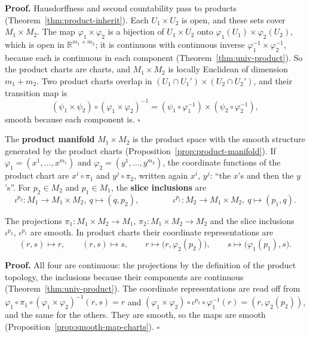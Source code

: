 \documentclass[11pt]{report}
\makeatletter
\newcounter{defcounter}[section]
\newcounter{thmcounter}[section]
\renewenvironment{proof}[1][Proof]{\noindent\textbf{#1.} }{\hfill$\square$\par\vspace{5pt}}
\newcommand{\thmlabel}[1]{\edef\@currentlabel{\arabic{section}.\arabic{thmcounter}}\label{#1}}
\newcommand{\deflabel}[1]{\edef\@currentlabel{\arabic{section}.\arabic{defcounter}}\label{#1}}
\makeatother
\begin{document}
\begin{proof}
Hausdorffness and second countability pass to products (Theorem~\ref{thm:product-inherit}). Each $U_1 \times U_2$ is open, and these sets cover $M_1 \times M_2$. The map $\varphi_1 \times \varphi_2$ is a bijection of $U_1 \times U_2$ onto $\varphi_1(U_1) \times \varphi_2(U_2)$, which is open in $\mathbb{R}^{m_1 + m_2}$; it is continuous with continuous inverse $\varphi_1^{-1} \times \varphi_2^{-1}$, because each is continuous in each component (Theorem~\ref{thm:univ-product}). So the product charts are charts, and $M_1 \times M_2$ is locally Euclidean of dimension $m_1 + m_2$. Two product charts overlap in $(U_1 \cap U_1') \times (U_2 \cap U_2')$, and their transition map is
\[
(\psi_1 \times \psi_2) \circ (\varphi_1 \times \varphi_2)^{-1} = (\psi_1 \circ \varphi_1^{-1}) \times (\psi_2 \circ \varphi_2^{-1}),
\]
smooth because each component is.
\end{proof}

\begin{defbox}\deflabel{def:product-manifold}
The \textbf{product manifold} $M_1 \times M_2$ is the product space with the smooth structure generated by the product charts (Proposition~\ref{prop:product-manifold}). If $\varphi_1 = (x^1, \ldots, x^{m_1})$ and $\varphi_2 = (y^1, \ldots, y^{m_2})$, the coordinate functions of the product chart are $x^i \circ \pi_1$ and $y^j \circ \pi_2$, written again $x^i$, $y^j$: ``the $x$'s and then the $y$'s''. For $p_2 \in M_2$ and $p_1 \in M_1$, the \textbf{slice inclusions} are
\[
\iota^{p_2} : M_1 \to M_1 \times M_2, \ q \mapsto (q, p_2), \qquad\qquad \iota^{p_1} : M_2 \to M_1 \times M_2, \ q \mapsto (p_1, q).
\]
\end{defbox}

\begin{propbox}\thmlabel{prop:product-maps}
The projections $\pi_1 : M_1 \times M_2 \to M_1$, $\pi_2 : M_1 \times M_2 \to M_2$ and the slice inclusions $\iota^{p_2}$, $\iota^{p_1}$ are smooth. In product charts their coordinate representations are
\[
(r, s) \mapsto r, \qquad (r, s) \mapsto s, \qquad r \mapsto \big(r, \varphi_2(p_2)\big), \qquad s \mapsto \big(\varphi_1(p_1), s\big).
\]
\end{propbox}

\begin{proof}
All four are continuous: the projections by the definition of the product topology, the inclusions because their components are continuous (Theorem~\ref{thm:univ-product}). The coordinate representations are read off from $\varphi_1 \circ \pi_1 \circ (\varphi_1 \times \varphi_2)^{-1}(r, s) = r$ and $(\varphi_1 \times \varphi_2) \circ \iota^{p_2} \circ \varphi_1^{-1}(r) = (r, \varphi_2(p_2))$, and the same for the others. They are smooth, so the maps are smooth (Proposition~\ref{prop:smooth-map-charts}).
\end{proof}
\end{document}
